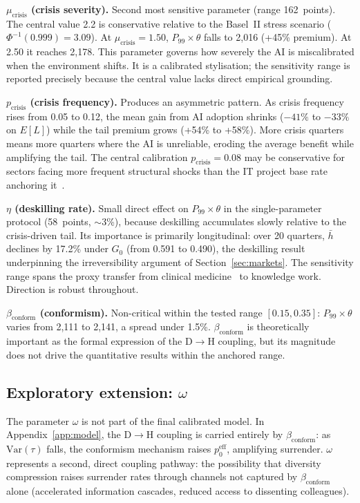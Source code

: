 \documentclass[11pt,a4paper]{article}
\begin{document}
\begin{appendices}
\textbf{$\mu_{\text{crisis}}$ (crisis severity).}
Second most sensitive parameter (range 162~points). The central value 2.2 is
conservative relative to the Basel~II stress scenario
($\Phi^{-1}(0.999) = 3.09$). At $\mu_{\text{crisis}} = 1.50$,
$P_{99}\times\theta$ falls to 2,016 (+45\% premium). At 2.50 it reaches
2,178. This parameter governs how severely the AI is miscalibrated when the
environment shifts. It is a calibrated stylisation; the sensitivity range is
reported precisely because the central value lacks direct empirical
grounding.

\textbf{$p_{\text{crisis}}$ (crisis frequency).}
Produces an asymmetric pattern. As crisis frequency rises from 0.05 to
0.12, the mean gain from AI adoption shrinks ($-41\%$ to $-33\%$ on
$E[L]$) while the tail premium grows (+54\% to +58\%). More crisis quarters
means more quarters where the AI is unreliable, eroding the average benefit
while amplifying the tail. The central calibration $p_{\text{crisis}} =
0.08$ may be conservative for sectors facing more frequent structural shocks
than the IT project base rate anchoring it~\cite{flyvbjerg_jmis_2022}.

\textbf{$\eta$ (deskilling rate).}
Small direct effect on $P_{99}\times\theta$ in the single-parameter
protocol (58~points, $\sim$3\%), because deskilling accumulates slowly
relative to the crisis-driven tail. Its importance is primarily
longitudinal: over 20 quarters, $\bar{h}$ declines by 17.2\% under $G_0$
(from 0.591 to 0.490), the deskilling result underpinning the
irreversibility argument of Section~\ref{sec:markets}. The sensitivity range
spans the proxy transfer from clinical
medicine~\cite{budzyn_lancetgh_2025,kahol_jse_2010} to knowledge work. Direction is robust
throughout.

\textbf{$\beta_{\text{conform}}$ (conformism).}
Non-critical within the tested range $[0.15, 0.35]$:
$P_{99}\times\theta$ varies from 2,111 to 2,141, a spread under 1.5\%.
$\beta_{\text{conform}}$ is theoretically important as the formal expression
of the D$\rightarrow$H coupling, but its magnitude does not drive the
quantitative results within the anchored range.

\subsection{Exploratory extension:
$\omega$}\label{app:sens:omega}

The parameter $\omega$ is not part of the final calibrated model. In
Appendix~\ref{app:model}, the D$\rightarrow$H coupling is carried entirely
by $\beta_{\text{conform}}$: as $\text{Var}(\tau)$ falls, the conformism
mechanism raises $p_0^{\text{eff}}$, amplifying surrender. $\omega$
represents a second, direct coupling pathway: the possibility that diversity
compression raises surrender rates through channels not captured by
$\beta_{\text{conform}}$ alone (accelerated information cascades, reduced
access to dissenting colleagues).


\end{appendices}
\end{document}
